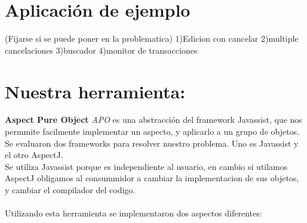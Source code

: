 \section{Aplicación de ejemplo}
(Fijarse si se puede poner en la problematica)
1)Edicion con cancelar
2)multiple cancelaciones
3)buscador
4)monitor de transacciones


\section{Nuestra herramienta: }
{\bf Aspect Pure Object } \emph{APO} es una abstracción del framework Javassist,
que nos permmite facilmente implementar un aspecto, y aplicarlo a un grupo de
objetos.
\\
Se evaluaron dos frameworks para resolver nuestro problema. Uno es Javassist y
el otro AspectJ.\\
Se utiliza Javassist porque es independiente al usuario, en cambio si utilamos
AspectJ obligamos al consummidor a cambiar la implementacion de sus objetos,
y cambiar el compilador del codigo. \\ \\ 

Utilizando esta herramienta se implementaron dos aspectos diferentes:

